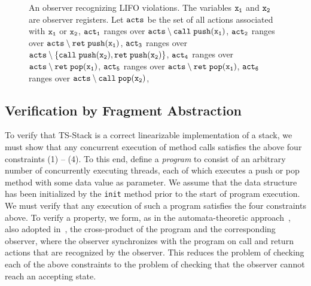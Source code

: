 \begin{figure}
\caption{An observer recognizing LIFO violations. The variables $\tt x_1$ and $\tt x_2$ are observer registers. Let $\tt acts$ be the set of all actions associated with $\tt x_1$ or $\tt x_2$, $\tt act_1$ ranges over $\tt acts \setminus call \;push(x_1)$, $\tt act_2$ ranges over $\tt acts \setminus ret \;push(x_1)$, $\tt act_3$ ranges over $\tt acts \setminus \{call \;push(x_2), ret\;push(x_2)\}$, $\tt act_4$ ranges over $\tt acts \setminus ret \;pop(x_1)$, $\tt act_5$ ranges over $\tt acts \setminus ret \;pop(x_1)$, $\tt act_6$ ranges over $\tt acts \setminus call \;pop(x_2)$,  
}
\label{fig:lifostack:fig}
\end{figure}

\subsection{Verification by Fragment Abstraction}
To verify that TS-Stack is a correct linearizable implementation of a stack, we
must show that any concurrent execution of method calls satisfies the
above four constraints (1) -- (4).
To this end, define a {\em program} to consist 
of an arbitrary number of concurrently executing threads,
%
each of which executes a push or pop method with some data value as parameter.
We assume that the data structure has been initialized
by the {\tt init} method prior to the start of program execution.
We must verify that any execution of such a program satisfies the four
constraints above. To verify a property, 
we form, as in the automata-theoretic approach~\cite{VW:modelchecking},
also adopted in~\cite{AHHR:integrated},
the cross-product of the program  and the corresponding
observer, where the observer synchronizes with the program on call and
return actions that are recognized by the observer. This reduces the
problem of checking each of the above constraints to the problem of checking
that the observer cannot reach an accepting state.

